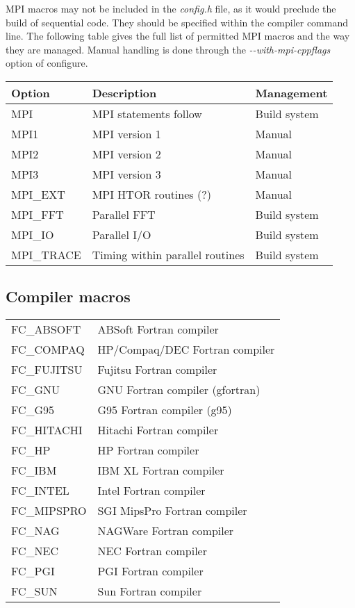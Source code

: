 MPI macros may not be included in the \textit{config.h} file, as it
would preclude the build of sequential code. They should be specified
within the compiler command line. The following table gives the full
list of permitted MPI macros and the way they are managed. Manual
handling is done through the \textit{-{-}with-mpi-cppflags} option of
configure.

\begin{center}
 \begin{tabular}{|l|l|l|}
  \hline
  \textbf{Option} & \textbf{Description} & \textbf{Management} \\
  \hline
  MPI & MPI statements follow & Build system \\
  \hline
  MPI1 & MPI version 1 & Manual \\
  MPI2 & MPI version 2 & Manual \\
  MPI3 & MPI version 3 & Manual \\
  \hline
  MPI\_EXT & MPI HTOR routines (?) & Manual \\
  MPI\_FFT & Parallel FFT & Build system \\
  MPI\_IO & Parallel I/O & Build system \\
  MPI\_TRACE & Timing within parallel routines & Build system \\
  \hline
 \end{tabular}
\end{center}



\subsection{Compiler macros}

\begin{center}
 \begin{tabular}{l l}
  FC\_ABSOFT & ABSoft Fortran compiler \\
  FC\_COMPAQ & HP/Compaq/DEC Fortran compiler \\
  FC\_FUJITSU & Fujitsu Fortran compiler \\
  FC\_GNU & GNU Fortran compiler (gfortran) \\
  FC\_G95 & G95 Fortran compiler (g95) \\
  FC\_HITACHI & Hitachi Fortran compiler \\
  FC\_HP & HP Fortran compiler \\
  FC\_IBM & IBM XL Fortran compiler \\
  FC\_INTEL & Intel Fortran compiler \\
  FC\_MIPSPRO & SGI MipsPro Fortran compiler \\
  FC\_NAG & NAGWare Fortran compiler \\
  FC\_NEC & NEC Fortran compiler \\
  FC\_PGI & PGI Fortran compiler \\
  FC\_SUN & Sun Fortran compiler \\
 \end{tabular}
\end{center}

